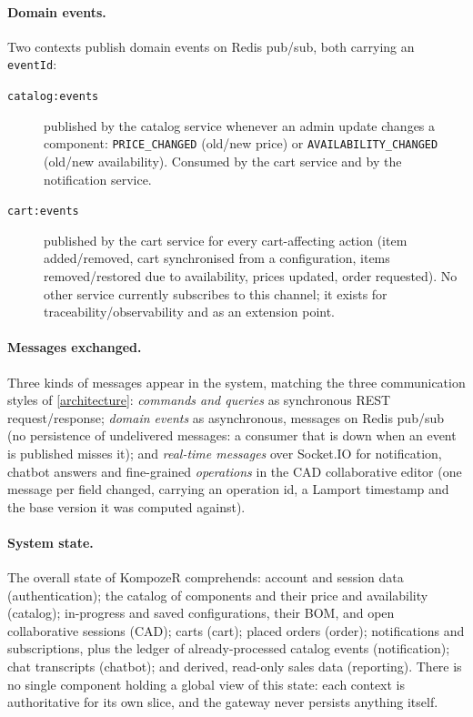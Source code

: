 \paragraph{Domain events.} Two contexts publish domain events on Redis
pub/sub, both carrying an \texttt{eventId}:

\begin{description}
  \item[\texttt{catalog:events}] published by the catalog service whenever an
  admin update changes a component: \texttt{PRICE\_CHANGED} (old/new price) or
  \texttt{AVAILABILITY\_CHANGED} (old/new availability). Consumed by the cart
  service and by the notification service.

  \item[\texttt{cart:events}] published by the cart service for every
  cart-affecting action (item added/removed, cart synchronised from a
  configuration, items removed/restored due to availability, prices updated,
  order requested). No other service currently subscribes to this channel; it
  exists for traceability/observability and as an extension point.
\end{description}

\paragraph{Messages exchanged.} Three kinds of messages appear in the system,
matching the three communication styles of \cref{architecture}: \emph{commands
and queries} as synchronous REST request/response; \emph{domain events} as asynchronous,
messages on Redis pub/sub (no persistence of undelivered
messages: a consumer that is down when an event is published misses it);
and \emph{real-time messages} over Socket.IO for notification, chatbot answers and fine-grained
\emph{operations} in the CAD collaborative editor (one message per field
changed, carrying an operation id, a Lamport timestamp and the base version it
was computed against).

\paragraph{System state.} The overall state of KompozeR comprehends: account
and session data (authentication); the catalog of components and their price
and availability (catalog); in-progress and saved configurations, their BOM,
and open collaborative sessions (CAD); carts (cart);
placed orders (order); notifications and subscriptions, plus the ledger of
already-processed catalog events (notification); chat transcripts (chatbot);
and derived, read-only sales data (reporting). There is no single
component holding a global view of this state: each context is authoritative
for its own slice, and the gateway never persists anything itself.

